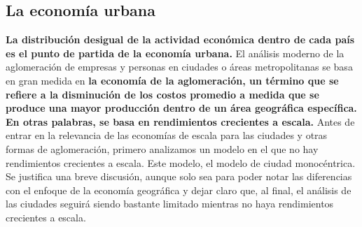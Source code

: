 \subsection{La economía urbana}

\textbf{La distribución desigual de la actividad económica dentro de cada país es el punto de partida de la economía urbana.} El análisis moderno de la aglomeración de empresas y personas en ciudades o áreas metropolitanas se basa en gran medida en \textbf{la economía de la aglomeración, un término que se refiere a la disminución de los costos promedio a medida que se produce una mayor producción dentro de un área geográfica específica. En otras palabras, se basa en rendimientos crecientes a escala.} Antes de entrar en la relevancia de las economías de escala para las ciudades y otras formas de aglomeración, primero analizamos un modelo en el que no hay rendimientos crecientes a escala. Este modelo, el modelo de ciudad monocéntrica. Se justifica una breve discusión, aunque solo sea para poder notar las diferencias con el enfoque de la economía geográfica y dejar claro que, al final, el análisis de las ciudades seguirá siendo bastante limitado mientras no haya rendimientos crecientes a escala.


